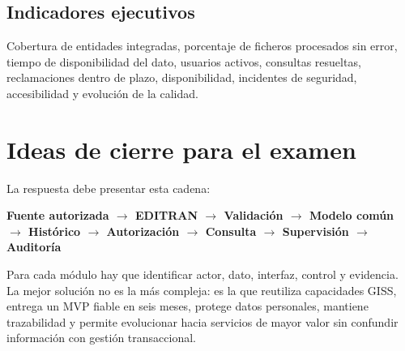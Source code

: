\documentclass[11pt,a4paper]{article}
\begin{document}
\subsection{Indicadores ejecutivos}
Cobertura de entidades integradas, porcentaje de ficheros procesados sin error, tiempo de disponibilidad del dato, usuarios activos, consultas resueltas, reclamaciones dentro de plazo, disponibilidad, incidentes de seguridad, accesibilidad y evolución de la calidad.

\section{Ideas de cierre para el examen}

La respuesta debe presentar esta cadena:
\begin{center}\Large\bfseries\color{navy}
Fuente autorizada $\rightarrow$ EDITRAN $\rightarrow$ Validación $\rightarrow$ Modelo común $\rightarrow$ Histórico $\rightarrow$ Autorización $\rightarrow$ Consulta $\rightarrow$ Supervisión $\rightarrow$ Auditoría
\end{center}

Para cada módulo hay que identificar actor, dato, interfaz, control y evidencia. La mejor solución no es la más compleja: es la que reutiliza capacidades GISS, entrega un MVP fiable en seis meses, protege datos personales, mantiene trazabilidad y permite evolucionar hacia servicios de mayor valor sin confundir información con gestión transaccional.
\end{document}
